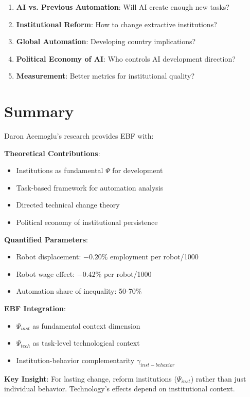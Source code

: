 \begin{enumerate}
    \item \textbf{AI vs. Previous Automation}: Will AI create enough new tasks?
    \item \textbf{Institutional Reform}: How to change extractive institutions?
    \item \textbf{Global Automation}: Developing country implications?
    \item \textbf{Political Economy of AI}: Who controls AI development direction?
    \item \textbf{Measurement}: Better metrics for institutional quality?
\end{enumerate}

\section{Summary}

\begin{tcolorbox}[colback=gray!5!white,colframe=gray!75!black,title=Chapter Summary]
Daron Acemoglu's research provides EBF with:

\textbf{Theoretical Contributions}:
\begin{itemize}
    \item Institutions as fundamental $\Psi$ for development
    \item Task-based framework for automation analysis
    \item Directed technical change theory
    \item Political economy of institutional persistence
\end{itemize}

\textbf{Quantified Parameters}:
\begin{itemize}
    \item Robot displacement: $-0.20\%$ employment per robot/1000
    \item Robot wage effect: $-0.42\%$ per robot/1000
    \item Automation share of inequality: 50-70\%
\end{itemize}

\textbf{EBF Integration}:
\begin{itemize}
    \item $\Psi_{inst}$ as fundamental context dimension
    \item $\Psi_{tech}$ as task-level technological context
    \item Institution-behavior complementarity $\gamma_{inst-behavior}$
\end{itemize}

\textbf{Key Insight}: For lasting change, reform institutions ($\Psi_{inst}$) rather than just individual behavior. Technology's effects depend on institutional context.
\end{tcolorbox}

